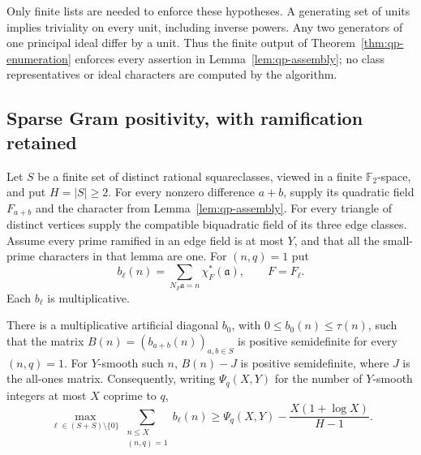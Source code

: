 Only finite lists are needed to enforce these hypotheses.  A generating
set of units implies triviality on every unit, including inverse powers.
Any two generators of one principal ideal differ by a unit.  Thus the
finite output of Theorem~\ref{thm:qp-enumeration} enforces every assertion
in Lemma~\ref{lem:qp-assembly}; no class representatives or ideal
characters are computed by the algorithm.

\subsection{Sparse Gram positivity, with ramification retained}
\label{subsec:qp-gram}

Let $S$ be a finite set of distinct rational squareclasses, viewed in a
finite $\mathbb F_2$-space, and put $H=|S|\geq2$.
For every nonzero difference $a+b$, supply its quadratic field
$F_{a+b}$ and the character from Lemma~\ref{lem:qp-assembly}.
For every triangle of distinct vertices supply the compatible
biquadratic field of its three edge classes.  Assume every prime ramified
in an edge field is at most $Y$, and that all the small-prime characters
in that lemma are one.  For $(n,q)=1$ put
\[
 b_\ell(n)=\sum_{N_F\mathfrak a=n}\chi_F^*(\mathfrak a),
 \qquad F=F_\ell.
\]
Each $b_\ell$ is multiplicative.

\begin{theorem}
\label{thm:qp-gram}
There is a multiplicative artificial diagonal $b_0$, with
$0\leq b_0(n)\leq\tau(n)$, such that the matrix
$B(n)=(b_{a+b}(n))_{a,b\in S}$ is positive semidefinite for every
$(n,q)=1$.  For $Y$-smooth such $n$, $B(n)-J$ is positive
semidefinite, where $J$ is the all-ones matrix.  Consequently, writing
$\Psi_q(X,Y)$ for the number of $Y$-smooth integers at most $X$ coprime
to $q$,
\begin{equation}
 \max_{\ell\in(S+S)\setminus\{0\}}
 \sum_{\substack{n\leq X\\(n,q)=1}}b_\ell(n)
 \geq \Psi_q(X,Y)-\frac{X(1+\log X)}{H-1}.
 \label{eq:qp-gram-average}
\end{equation}
\end{theorem}

